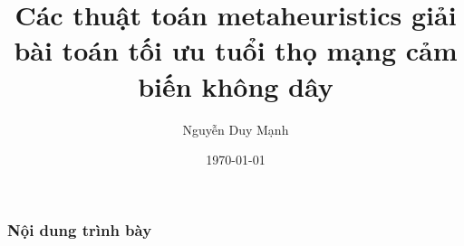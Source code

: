 \documentclass{beamer}
\title[]{Các thuật toán metaheuristics giải bài toán tối ưu tuổi thọ mạng cảm  biến không dây} %
\author{Nguyễn Duy Mạnh} %
\institute[HUST] %
{
Hanoi University of Sciences and Technology \\ %
\medskip
\textit{nguyenduymanhbk59@gmail.com} %
}
\date{\today} %
\begin{document}


\begin{frame}
\frametitle{Nội dung trình bày} %
\tableofcontents %
\end{frame}







\end{document}
